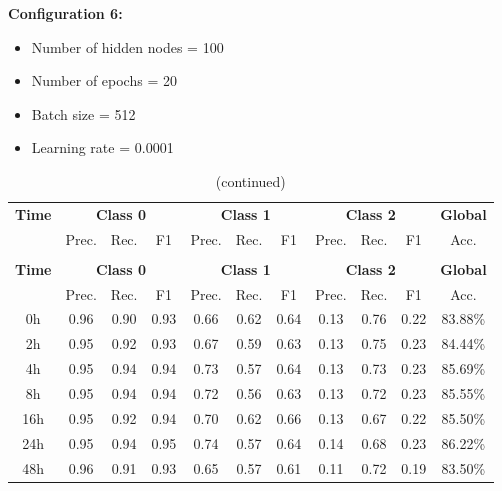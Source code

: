 \documentclass[12pt,oneside]{book} %
\begin{document}
\noindent \textbf{Configuration 6:}
\begin{multicols}{2}
    \begin{itemize}
        \item Number of hidden nodes = 100
        \item Number of epochs = 20
    \end{itemize}
    \begin{itemize}
         \item Batch size = 512
         \item Learning rate = 0.0001
    \end{itemize}
\end{multicols}

\setlength\LTleft{1cm}
\begin{longtable}{ c ccc ccc ccc c}
\caption{Performance metrics of the LNN model for configuration 6} \\
\toprule
\textbf{Time} & \multicolumn{3}{c}{\textbf{Class 0}} & \multicolumn{3}{c}{\textbf{Class 1}} & \multicolumn{3}{c}{\textbf{Class 2}} & \textbf{Global} \\
               & Prec. & Rec. & F1  & Prec. & Rec. & F1   & Prec. & Rec. & F1  & Acc. \\
\midrule
\endfirsthead

\caption[]{(continued)} \\
\toprule
\textbf{Time} & \multicolumn{3}{c}{\textbf{Class 0}} & \multicolumn{3}{c}{\textbf{Class 1}} & \multicolumn{3}{c}{\textbf{Class 2}} & \textbf{Global} \\
               & Prec. & Rec. & F1  & Prec. & Rec. & F1   & Prec. & Rec. & F1  & Acc. \\
\midrule
\endhead

\bottomrule
\endfoot

\bottomrule
\endlastfoot

0h   & 0.96  & 0.90 & 0.93 & 0.66  & 0.62 & 0.64  & 0.13  & 0.76 & 0.22 & 83.88\% \\
2h   & 0.95  & 0.92 & 0.93 & 0.67  & 0.59 & 0.63  & 0.13  & 0.75 & 0.23 & 84.44\% \\
4h   & 0.95  & 0.94 & 0.94 & 0.73  & 0.57 & 0.64  & 0.13  & 0.73 & 0.23 & 85.69\% \\
8h   & 0.95  & 0.94 & 0.94 & 0.72  & 0.56 & 0.63  & 0.13  & 0.72 & 0.23 & 85.55\% \\
16h  & 0.95  & 0.92 & 0.94 & 0.70  & 0.62 & 0.66  & 0.13  & 0.67 & 0.22 & 85.50\% \\
24h  & 0.95  & 0.94 & 0.95 & 0.74  & 0.57 & 0.64  & 0.14  & 0.68 & 0.23 & 86.22\% \\
48h  & 0.96  & 0.91 & 0.93 & 0.65  & 0.57 & 0.61  & 0.11  & 0.72 & 0.19 & 83.50\% \\
\end{longtable}
\end{document}
